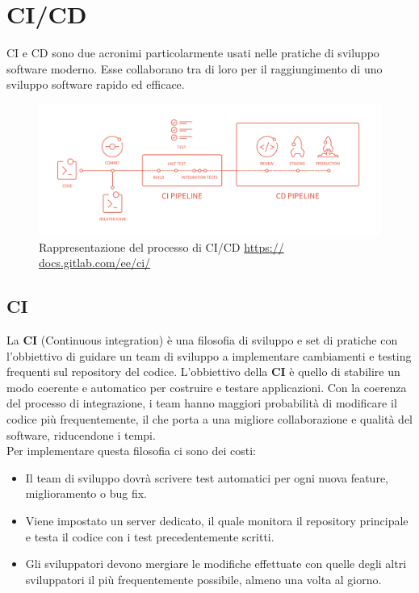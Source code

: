 \section{CI/CD}
\label{CICD}

CI e CD sono due acronimi particolarmente usati nelle pratiche di sviluppo software moderno. Esse collaborano tra di loro per il raggiungimento di uno sviluppo software rapido ed efficace. 

\begin{figure}[H]
\centering
	\includegraphics[width=0.9\linewidth]{./images/cicd_pipeline_gitlab.png} 
	\caption{Rappresentazione del processo di CI/CD \url{ https:// docs.gitlab.com/ee/ci/}}
	\label{vmodel}
\end{figure}

\subsection{CI}

La \textbf{CI} (Continuous integration) è una filosofia di sviluppo e set di pratiche con l'obbiettivo di guidare un team di sviluppo a implementare cambiamenti e testing frequenti sul repository del codice. 
L'obbiettivo della \textbf{CI} è quello di stabilire un modo coerente e automatico per costruire e testare applicazioni. Con la coerenza del processo di integrazione, i team hanno  maggiori probabilità di modificare il codice più frequentemente, il che porta a una migliore collaborazione e qualità del software, riducendone i tempi. \\
Per implementare questa filosofia ci sono dei costi: 
\begin{itemize}
	\item Il team di sviluppo dovrà scrivere test automatici per ogni nuova feature, miglioramento o bug fix. 
	\item Viene impostato un server dedicato, il quale monitora il repository principale e testa il codice con i test precedentemente scritti. 
	\item Gli sviluppatori devono mergiare le modifiche effettuate con quelle degli altri sviluppatori il più frequentemente possibile, almeno una volta al giorno. 
\end{itemize}

